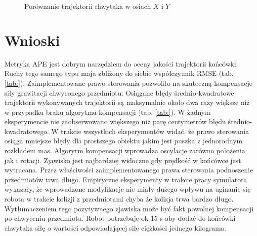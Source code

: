 \begin{figure}[H]
	\centering
	\hfill
	\caption{Porównanie trajektorii chwytaka w osiach $X$ i $Y$}
	\label{fig:obrt_porow_przedm_bok}
\end{figure}


\section{Wnioski}

Metryka APE jest dobrym narzędziem do oceny jakości trajektorii końcówki. Ruchy tego samego typu maja zbliżony do siebie współczynnik RMSE (tab. \ref{tab:}). 
Zaimplementowane prawo sterowania pozwoliło na skuteczną kompensacje siły grawitacji chwyconego przedmiotu. Osiągane błędy średnio-kwadratowe trajektorii wykonywanych trajektorii są maksymalnie około dwa razy większe niż w przypadku braku algorytmu kompensacji (tab. \ref{tab:}). W żadnym eksperymencie nie zaobserwowano większego niż parę centymetrów błędu średnio-kwadratowego. W trakcie wszystkich eksperymentów widać, że prawo sterowania osiąga mniejsze błędy dla prostszego obiektu jakim jest puszka z jednorodnym rozkładem mas. Algorytm kompensacji wprowadza oscylacje zarówno położenia jak i rotacji. Zjawisko jest najbardziej widoczne gdy prędkość w końcówce jest wytracana. Przez właściwości zaimplementowanego prawa sterowania podnoszenie przedmiotów trwa długo. Empiryczne eksperymenty w trakcie pracy symulatora wykazały, że wprowadzone modyfikacje nie miały dużego wpływu na uginanie się robota w trakcie kolizji z przedmiotami chyba że kolizja trwa bardzo długo. Wytłumaczeniem tego pozytywnego zjawiska może być fakt powolnej kompensacji po chwyceniu przedmiotu. Robot potrzebuje ok 15 s aby dodać do końcówki chwytaka siłę o wartości odpowiadającej sile ciężkości jednego kilograma. 


